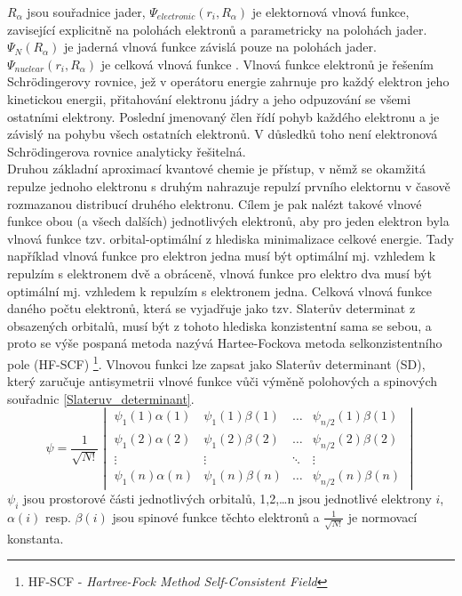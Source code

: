 \documentclass[
  digital, %
  table,   %
  lof,     %
  lot,     %
  oneside,
]{fithesis3}
\begin{document}
$R_{\alpha}$ jsou souřadnice jader, $\Psi_{electronic}(r_i,R_{\alpha})$ je elektornová vlnová funkce, zavisející explicitně na polohách elektronů a parametricky na polohách jader. $\Psi_N(R_{\alpha})$ je jaderná vlnová funkce závislá pouze na polohách jader. $ \Psi_{nuclear}(r_i, R_{\alpha}) $ je celková vlnová funkce \cite{lechamolecularmodeling}.
Vlnová funkce elektronů je řešením Schrödingerovy rovnice, jež v operátoru energie zahrnuje pro každý elektron jeho kinetickou energii, přitahování elektronu jádry a jeho odpuzování se všemi ostatními elektrony. Poslední jmenovaný člen řídí pohyb každého elektronu a je závislý na pohybu všech ostatních elektronů. V důsledků toho není elektronová Schrödingerova rovnice analyticky řešitelná. \\

Druhou základní aproximací kvantové chemie je přístup, v němž se okamžitá repulze jednoho elektronu s druhým nahrazuje repulzí prvního elektornu v časově rozmazanou distribucí druhého elektronu. Cílem je pak nalézt takové vlnové funkce obou (a všech dalších) jednotlivých elektronů, aby pro jeden elektron byla vlnová funkce tzv. orbital-optimální z hlediska minimalizace celkové energie. Tady například vlnová funkce pro elektron jedna musí být optimální mj. vzhledem k repulzím s elektronem dvě a obráceně, vlnová funkce pro elektro dva musí být optimální mj. vzhledem k repulzím s elektronem jedna. Celková vlnová funkce daného počtu elektronů, která se vyjadřuje jako tzv. Slaterův determinat z obsazených orbitalů, musí být z tohoto hlediska konzistentní sama se sebou, a proto se výše pospaná metoda nazývá Hartee-Fockova metoda selkonzistentního pole (HF-SCF) \footnote{HF-SCF - \textit{Hartree-Fock Method Self-Consistent Field}}. Vlnovou funkci lze zapsat jako Slaterův determinant (SD), který zaručuje antisymetrii vlnové funkce vůči výměně polohových a spinových souřadnic \ref{Slateruv_determinant}.
\begin{equation}
\psi =  \frac{1}{\sqrt{N!}}\begin{vmatrix}
\psi_1(1)\alpha(1) & \psi_1(1) \beta (1)  & \dots & \psi_{n/2}(1)\beta(1) \\
\psi_1(2)\alpha(2) & \psi_1(2) \beta (2) & \dots & \psi_{n/2}(2)\beta(2) \\
\vdots             & \vdots                           & \ddots & \vdots \\
\psi_1(n)\alpha(n) & \psi_1(n) \beta (n) & \dots & \psi_{n/2}(n)\beta(n)
\end{vmatrix}
\label{Slateruv_determinant}
\end{equation}
$\psi_i$ jsou prostorové části jednotlivých orbitalů, 1,2,\dots n jsou jednotlivé elektrony $i$, $\alpha(i)$ resp. $\beta(i)$ jsou spinové funkce těchto elektronů a $\frac{1}{\sqrt{N!}}$ je normovací konstanta.
\end{document}
